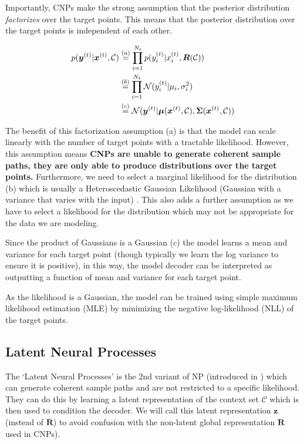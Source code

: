 \documentclass[../../main.tex]{subfiles}
\begin{document}
Importantly, CNPs make the strong assumption that the posterior distribution \emph{factorizes} over the target points. This means that the posterior distribution over the target points is independent of each other. 

\begin{align}
    p(\bm{y}^{(t)} | \bm{x}^{(t)}, \mathcal{C}) &\stackrel{(a)}{=} \prod_{i=1}^{N_t} p({y}_i^{(t)} | {x}_i^{(t)}, \bm{R}(\mathcal{C})) \\ &\stackrel{(b)}{=}
    \prod_{i=1}^{N_t} \mathcal{N}({y}_i^{(t)} | \mu_i, \sigma_i^2) \\&\stackrel{(c)}{=} \mathcal{N}(\bm{y}^{(t)} | \bm{\mu}(\bm{x}^{(t)}, \mathcal{C}), \bm{\Sigma}(\bm{x}^{(t)}, \mathcal{C}))
\end{align}

The benefit of this factorization assumption (a) is that the model can scale linearly with the number of target points with a tractable likelihood. However, this assumption means
\textbf{CNPs are unable to generate coherent sample paths, they are only able to produce distributions over the target points.} Furthermore, we need to select a marginal likelihood for the distribution (b) which is usually a Heteroscedastic Gaussian Likelihood (Gaussian with a variance that varies with the input) \cite{garnelo2018conditional}. This also adds a further assumption as we have to select a likelihood for the distribution which may not be appropriate for the data we are modeling.

Since the product of Gaussians is a Gaussian (c) the model learns a mean and variance for each target point (though typically we learn the log variance to ensure it is positive), in this way, the model decoder can be interpreted as outputting a function of mean and variance for each target point.

As the likelihood is a Gaussian, the model can be trained using simple maximum likelihood estimation (MLE) by minimizing the negative log-likelihood (NLL) of the target points.


\subsection{Latent Neural Processes}

The `Latent Neural Processes' is the 2nd variant of NP (introduced in \cite{garnelo2018neural} ) which can generate coherent sample paths and are not restricted to a specific likelihood. They can do this by learning a latent representation of the context set $\mathcal{C}$ which is then used to condition the decoder. We will call this latent representation $\mathbf{z}$ (instead of $\bm{R}$) to avoid confusion with the non-latent global representation $\bm{R}$ used in CNPs).
\end{document}
